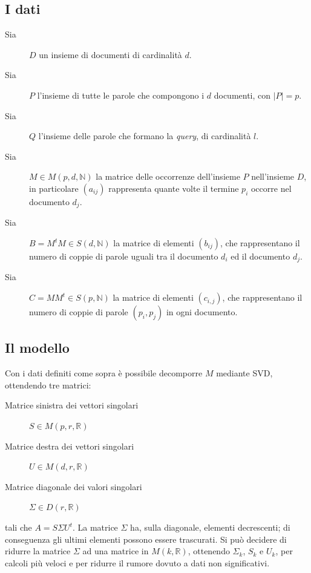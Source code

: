 \documentclass[12pt,a4paper]{article}
\theoremstyle{thm}
\theoremstyle{def}
\begin{document}
\subsection{I dati}
\label{dati}
\begin{description}
\item[{\sc Sia}] $D$ un insieme di documenti di cardinalità $d$.
\item[{\sc Sia}] $P$ l'insieme di tutte le parole che compongono i $d$ documenti, con $|P| = p$.
\item[{\sc Sia}] $Q$ l'insieme delle parole che formano la \textit{query}, di cardinalità $l$.
\item[{\sc Sia}] $M \in M(p,d,\mathds{N})$ la matrice delle occorrenze dell'insieme $P$ nell'insieme $D$, in particolare $(a_{ij})$ rappresenta quante volte il termine $p_i$ occorre nel documento $d_j$.
\item[{\sc Sia}] $B=M^tM \in S(d, \mathds{N})$ la matrice di elementi $(b_{ij})$, che rappresentano il numero di coppie di parole uguali tra il documento $d_i$ ed il documento $d_j$.
\item[{\sc Sia}] $C=MM^t \in S(p, \mathds{N})$ la matrice di elementi $(c_{i,j})$, che rappresentano il numero di coppie di parole $(p_i, p_j)$ in ogni documento.
\end{description}


\subsection{Il modello}
Con i dati definiti come sopra è possibile decomporre $M$ mediante SVD, ottendendo tre matrici:
\begin{description}
\item[{\sc Matrice sinistra dei vettori singolari}] $S \in M(p,r,\mathds{R})$
\item[{\sc Matrice destra dei vettori singolari}] $U \in M(d,r,\mathds{R})$
\item[{\sc Matrice diagonale dei valori singolari}] $\Sigma \in D(r,\mathds{R})$
\end{description}
tali che $A=S\Sigma U^t$.
La matrice $\Sigma$ ha, sulla diagonale, elementi decrescenti; di conseguenza gli ultimi elementi possono essere trascurati.
Si può decidere di ridurre la matrice $\Sigma$ ad una matrice in $M(k, \mathds{R})$, ottenendo $\Sigma_k$, $S_k$ e $U_k$, per calcoli più veloci e per ridurre il rumore dovuto a dati non significativi.
\end{document}

